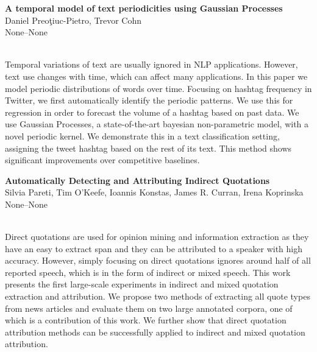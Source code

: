 \documentclass[twoside,makeidx]{book}
\begin{document}
\par\vspace{2em}\noindent%
\begin{minipage}{\linewidth}%
\begin{center}
\textbf{\normalsize A temporal model of text periodicities using Gaussian Processes}\\
\normalsize  Daniel Preo\c{t}iuc-Pietro,  Trevor Cohn\\
{\small None--None}\\
\end{center}
\end{minipage}\\[0.5em]
\nopagebreak%
\noindent%
{\small Temporal variations of text are usually ignored in NLP applications. However, text use changes with time, which can affect many applications. In this paper we model periodic distributions of words over time. Focusing on hashtag frequency in Twitter, we first automatically identify the periodic patterns. We use this for regression in order to forecast the volume of a hashtag based on past data. We use Gaussian Processes, a state-of-the-art bayesian non-parametric model, with a novel periodic kernel. We demonstrate this in a text classification setting, assigning the tweet hashtag based on the rest of its text. This method shows significant improvements over competitive baselines.}
\par\vspace{2em}\noindent%
\begin{minipage}{\linewidth}%
\begin{center}
\textbf{\normalsize Automatically Detecting and Attributing Indirect Quotations}\\
\normalsize  Silvia Pareti,  Tim O'Keefe,  Ioannis Konstas,  James R. Curran,  Irena Koprinska\\
{\small None--None}\\
\end{center}
\end{minipage}\\[0.5em]
\nopagebreak%
\noindent%
{\small Direct quotations are used for opinion mining and information extraction as they have an easy to extract span and they can be attributed to a speaker with high accuracy. However, simply focusing on direct quotations ignores around half of all reported speech, which is in the form of indirect or mixed speech. This work presents the first large-scale experiments in indirect and mixed quotation extraction and attribution.  We propose two methods of extracting all quote types from news articles and evaluate them on two large annotated corpora, one of which is a contribution of this work. We further show that direct quotation attribution methods can be successfully applied to indirect and mixed quotation attribution.}
\end{document}
